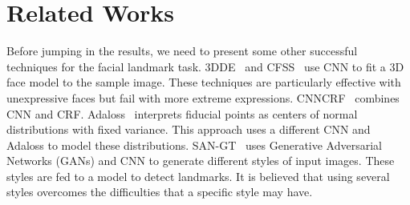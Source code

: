 \section{Related Works}\label{sect:related}
Before jumping in the results, we need to present some other successful techniques for the facial landmark task. 3DDE~\cite{Zhu16} and CFSS~\cite{Valle19} use CNN to fit a 3D face model to the sample image. These techniques are particularly effective with unexpressive faces but fail with more extreme expressions. CNNCRF~\cite{Chen19} combines CNN and CRF. Adaloss~\cite{Teixeira19} interprets fiducial points as centers of normal distributions with fixed variance. This approach uses a different CNN and Adaloss to model these distributions. SAN-GT~\cite{Dong18} uses Generative Adversarial Networks (GANs) and CNN to generate different styles of input images. These styles are fed to a model to detect landmarks. It is believed that using several styles overcomes the difficulties that a specific style may have.   



